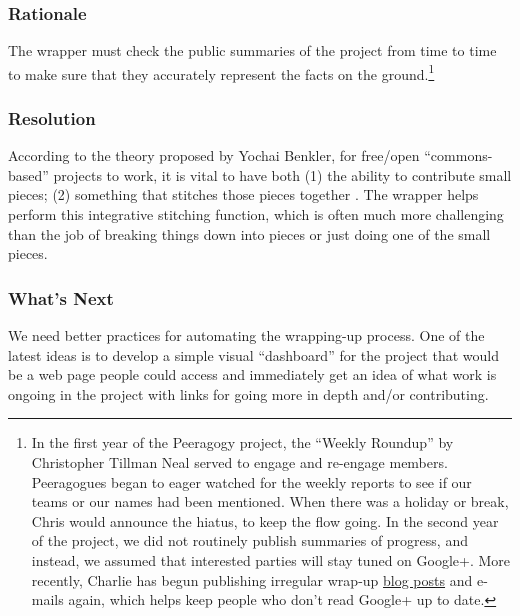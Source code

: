 \subsubsection*{Rationale}
The wrapper must check the public summaries of the project from time to time to make sure that they accurately represent the facts on the ground.\footnote{In the first year of the Peeragogy project, the ``Weekly Roundup'' by Christopher Tillman Neal served to engage and re-engage members. Peeragogues began to eager watched for the weekly reports to see if our teams or our names had been mentioned. When there was a holiday or break, Chris would announce the hiatus, to keep the flow going. In the second year of the project, we did not routinely publish summaries of progress, and instead, we assumed that interested parties will stay tuned on Google+.  More recently, Charlie has begun publishing irregular wrap-up \href{http://peeragogy.org/peeragogy-wrapper-post-9-feb-5-apr-2015/}{blog posts} and e-mails again, which helps keep people who don't read Google+ up to date.}

\subsubsection*{Resolution} 
According to the theory proposed by Yochai Benkler, for free/open ``commons-based'' projects to work, it is vital to have both (1) the ability to contribute small pieces; (2) something that stitches those pieces together \cite{coases-penguin}. The wrapper helps perform this integrative stitching function, which is often much more challenging than the job of breaking things down into pieces or just doing one of the small pieces.

\subsubsection*{What's Next}
We need better practices for automating the wrapping-up process. One of the latest ideas is to develop a simple visual ``dashboard'' for the project that would be a web page people could access and immediately get an idea of what work is ongoing in the project with links for going more in depth and/or contributing.
\endgroup
    